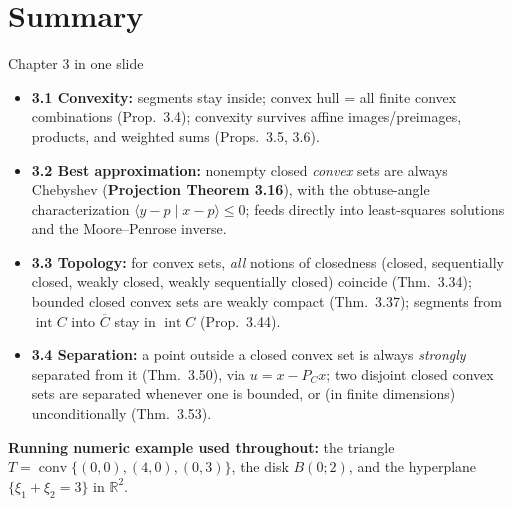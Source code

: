 \documentclass[aspectratio=169,10pt]{beamer}
\newcommand{\R}{\mathbb{R}}
\newcommand{\conv}{\operatorname{conv}}
\newcommand{\ip}[2]{\langle #1 \mid #2 \rangle}
\newcommand{\PC}{P_C}
\begin{document}
\section{Summary}

\begin{frame}{Chapter 3 in one slide}
  \begin{itemize}
    \item \textbf{3.1 Convexity:} segments stay inside; convex hull =
      all finite convex combinations (Prop.\ 3.4); convexity survives
      affine images/preimages, products, and weighted sums (Props.\ 3.5,
      3.6).
    \item \textbf{3.2 Best approximation:} nonempty closed \emph{convex}
      sets are always Chebyshev (\textbf{Projection Theorem 3.16}), with the
      obtuse-angle characterization $\ip{y-p}{x-p}\le 0$; feeds directly
      into least-squares solutions and the Moore--Penrose inverse.
    \item \textbf{3.3 Topology:} for convex sets, \emph{all} notions of
      closedness (closed, sequentially closed, weakly closed, weakly
      sequentially closed) coincide (Thm.\ 3.34); bounded closed convex
      sets are weakly compact (Thm.\ 3.37); segments from
      $\operatorname{int}C$ into $\overline C$ stay in $\operatorname{int}C$
      (Prop.\ 3.44).
    \item \textbf{3.4 Separation:} a point outside a closed convex set is
      always \emph{strongly} separated from it (Thm.\ 3.50), via
      $u=x-\PC x$; two disjoint closed convex sets are separated whenever
      one is bounded, or (in finite dimensions) unconditionally (Thm.\ 3.53).
  \end{itemize}
  \medskip
  \textbf{Running numeric example used throughout:} the triangle
  $T=\conv\{(0,0),(4,0),(0,3)\}$, the disk $B(0;2)$, and the hyperplane
  $\{\xi_1+\xi_2=3\}$ in $\R^2$.
\end{frame}
\end{document}
